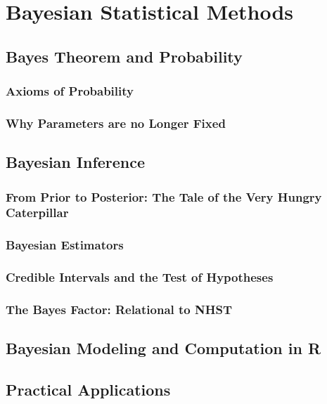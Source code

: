 \chapter{Bayesian Statistical Methods}

\section{Bayes Theorem and Probability} %

\subsection{Axioms of Probability}

\subsection{Why Parameters are no Longer Fixed}

\section{Bayesian Inference} %

\subsection{From Prior to Posterior: The Tale of the Very Hungry Caterpillar}

\subsection{Bayesian Estimators}

\subsection{Credible Intervals and the Test of Hypotheses}

\subsection{The Bayes Factor: Relational to NHST}


\section{Bayesian Modeling and Computation in R} %

\section{Practical Applications} %